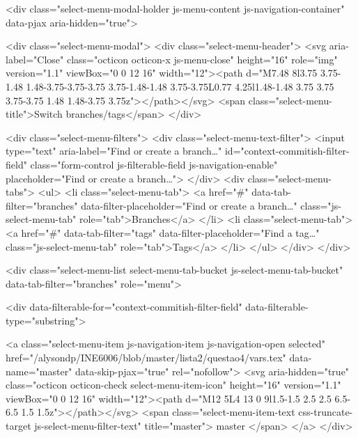   <div class="select-menu-modal-holder js-menu-content js-navigation-container" data-pjax aria-hidden="true">

    <div class="select-menu-modal">
      <div class="select-menu-header">
        <svg aria-label="Close" class="octicon octicon-x js-menu-close" height="16" role="img" version="1.1" viewBox="0 0 12 16" width="12"><path d="M7.48 8l3.75 3.75-1.48 1.48-3.75-3.75-3.75 3.75-1.48-1.48 3.75-3.75L0.77 4.25l1.48-1.48 3.75 3.75 3.75-3.75 1.48 1.48-3.75 3.75z"></path></svg>
        <span class="select-menu-title">Switch branches/tags</span>
      </div>

      <div class="select-menu-filters">
        <div class="select-menu-text-filter">
          <input type="text" aria-label="Find or create a branch…" id="context-commitish-filter-field" class="form-control js-filterable-field js-navigation-enable" placeholder="Find or create a branch…">
        </div>
        <div class="select-menu-tabs">
          <ul>
            <li class="select-menu-tab">
              <a href="#" data-tab-filter="branches" data-filter-placeholder="Find or create a branch…" class="js-select-menu-tab" role="tab">Branches</a>
            </li>
            <li class="select-menu-tab">
              <a href="#" data-tab-filter="tags" data-filter-placeholder="Find a tag…" class="js-select-menu-tab" role="tab">Tags</a>
            </li>
          </ul>
        </div>
      </div>

      <div class="select-menu-list select-menu-tab-bucket js-select-menu-tab-bucket" data-tab-filter="branches" role="menu">

        <div data-filterable-for="context-commitish-filter-field" data-filterable-type="substring">


            <a class="select-menu-item js-navigation-item js-navigation-open selected"
               href="/alysondp/INE6006/blob/master/lista2/questao4/vars.tex"
               data-name="master"
               data-skip-pjax="true"
               rel="nofollow">
              <svg aria-hidden="true" class="octicon octicon-check select-menu-item-icon" height="16" version="1.1" viewBox="0 0 12 16" width="12"><path d="M12 5L4 13 0 9l1.5-1.5 2.5 2.5 6.5-6.5 1.5 1.5z"></path></svg>
              <span class="select-menu-item-text css-truncate-target js-select-menu-filter-text" title="master">
                master
              </span>
            </a>
        </div>

